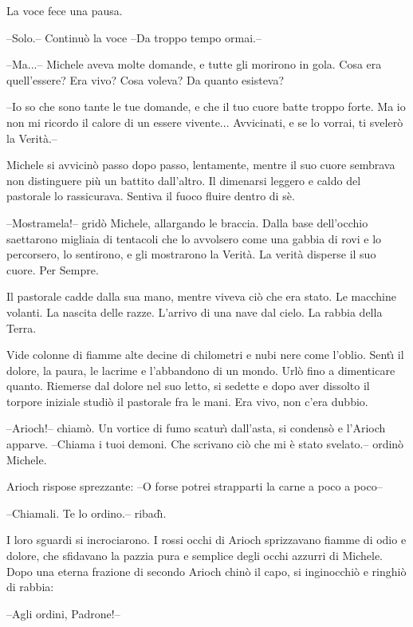 \begin{racconto}
  La voce fece una pausa.
  
  --Solo.-- Continu\`o la voce --Da troppo tempo ormai.--
  
  --Ma...-- Michele aveva molte domande, e tutte gli morirono in gola.
  Cosa era quell'essere? Era vivo? Cosa voleva? Da quanto esisteva?
  
  --Io so che sono tante le tue domande, e che il tuo cuore batte
  troppo forte. Ma io non mi ricordo il calore di un essere vivente...
  Avvicinati, e se lo vorrai, ti sveler\`o la Verit\`a.--
  
  Michele si avvicin\`o passo dopo passo, lentamente, mentre il suo
  cuore sembrava non distinguere pi\`u un battito dall'altro. Il
  dimenarsi leggero e caldo del pastorale lo rassicurava. Sentiva il
  fuoco fluire dentro di s\`e.
  
  --Mostramela!-- grid\`o Michele, allargando le braccia. Dalla base
  dell'occhio saettarono migliaia di tentacoli che lo avvolsero come
  una gabbia di rovi e lo percorsero, lo sentirono, e gli mostrarono
  la Verit\`a. La verit\`a disperse il suo cuore. Per Sempre.
  
  Il pastorale cadde dalla sua mano, mentre viveva ci\`o che era
  stato.  Le macchine volanti. La nascita delle razze. L'arrivo di una
  nave dal cielo.  La rabbia della Terra.
  
  Vide colonne di fiamme alte decine di chilometri e nubi nere come
  l'oblio.  Sent\`{\i} il dolore, la paura, le lacrime e l'abbandono
  di un mondo. Url\`o fino a dimenticare quanto. Riemerse dal dolore
  nel suo letto, si sedette e dopo aver dissolto il torpore iniziale
  studi\`o il pastorale fra le mani. Era vivo, non c'era dubbio.
  
  --Arioch!-- chiam\`o. Un vortice di fumo scatur\`{\i} dall'asta, si
  condens\`o e l'Arioch apparve. --Chiama i tuoi demoni. Che scrivano
  ci\`o che mi \`e stato svelato.-- ordin\`o Michele.
  
  Arioch rispose sprezzante: --O forse potrei strapparti la carne a
  poco a poco--
  
  --Chiamali. Te lo ordino.-- ribad\`{\i}.
  
  I loro sguardi si incrociarono. I rossi occhi di Arioch sprizzavano
  fiamme di odio e dolore, che sfidavano la pazzia pura e semplice
  degli occhi azzurri di Michele. Dopo una eterna frazione di secondo
  Arioch chin\`o il capo, si inginocchi\`o e ringhi\`o di
  rabbia:
  
  --Agli ordini, Padrone!--
  

\end{racconto}
